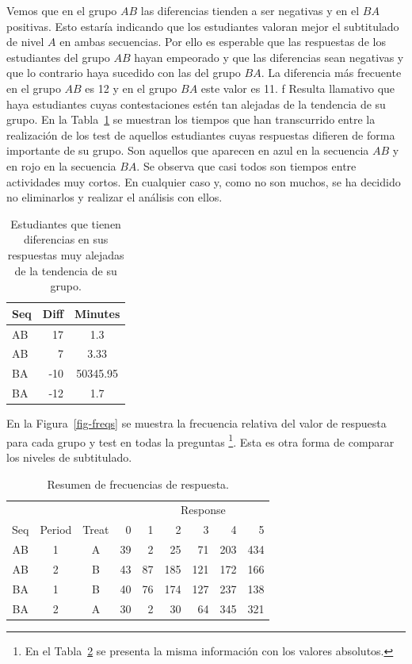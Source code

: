 \documentclass[
  12pt,
  a4paper,
  extrafontsizes,
  onecolumn,
  openright,
  table]{memoir}
\begin{document}
Vemos que en el grupo \(AB\) las diferencias tienden a ser negativas y
en el \(BA\) positivas. Esto estaría indicando que los estudiantes
valoran mejor el subtitulado de nivel \(A\) en ambas secuencias. Por
ello es esperable que las respuestas de los estudiantes del grupo \(AB\)
hayan empeorado y que las diferencias sean negativas y que lo contrario
haya sucedido con las del grupo \(BA\). La diferencia más frecuente en
el grupo \(AB\) es 12 y en el grupo \(BA\) este valor es 11. f Resulta
llamativo que haya estudiantes cuyas contestaciones estén tan alejadas
de la tendencia de su grupo. En la Tabla~\ref{tbl-diff} se muestran los
tiempos que han transcurrido entre la realización de los test de
aquellos estudiantes cuyas respuestas difieren de forma importante de su
grupo. Son aquellos que aparecen en azul en la secuencia \(AB\) y en
rojo en la secuencia \(BA\). Se observa que casi todos son tiempos entre
actividades muy cortos. En cualquier caso y, como no son muchos, se ha
decidido no eliminarlos y realizar el análisis con ellos.

\hypertarget{tbl-diff}{}
\begin{longtable}{lrc}
\caption{\label{tbl-diff}Estudiantes que tienen diferencias en sus respuestas muy alejadas de la
tendencia de su grupo. }\tabularnewline

\toprule
Seq & Diff & Minutes \\ 
\midrule
AB & 17 & 1.3 \\ 
AB & 7 & 3.33 \\ 
BA & -10 & 50345.95 \\ 
BA & -12 & 1.7 \\ 
\bottomrule
\end{longtable}

En la Figura~\ref{fig-freqs} se muestra la frecuencia relativa del valor
de respuesta para cada grupo y test en todas la preguntas \footnote{En
  el Tabla~\ref{tbl-resume} se presenta la misma información con los
  valores absolutos.}. Esta es otra forma de comparar los niveles de
subtitulado.

\hypertarget{tbl-resume}{}
\begin{longtable}{cccrrrrrr}
\caption{\label{tbl-resume}Resumen de frecuencias de respuesta. }\tabularnewline

\toprule
 &  &  &  & \multicolumn{5}{c}{Response} \\ 
\cmidrule(lr){5-9}
Seq & Period & Treat & 0 & 1 & 2 & 3 & 4 & 5 \\ 
\midrule
AB & 1 & A & 39 & 2 & 25 & 71 & 203 & 434 \\ 
AB & 2 & B & 43 & 87 & 185 & 121 & 172 & 166 \\ 
BA & 1 & B & 40 & 76 & 174 & 127 & 237 & 138 \\ 
BA & 2 & A & 30 & 2 & 30 & 64 & 345 & 321 \\ 
\bottomrule
\end{longtable}
\end{document}

